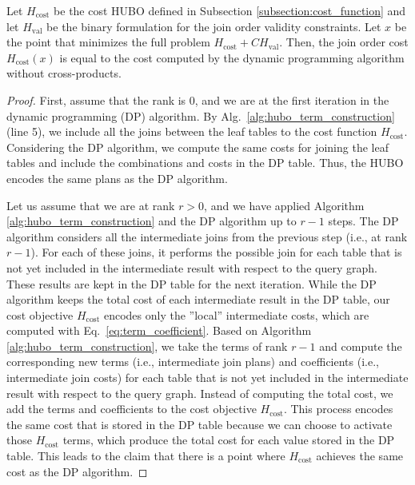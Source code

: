 \begin{theorem}\label{thm:dp_bound}
Let  $H_{\text{cost}}$ be the cost HUBO defined in Subsection \ref{subsection:cost_function} and let $H_{\text{val}}$ be the binary formulation for the join order validity constraints. Let $x$ be the point that minimizes the full problem $H_{\text{cost}} + CH_{\text{val}}$. Then, the join order cost $H_{\text{cost}}(x)$ is equal to the cost computed by the dynamic programming algorithm without cross-products.
\end{theorem}
\begin{proof}
First, assume that the rank is $0$, and we are at the first iteration in the dynamic programming (DP) algorithm. By Alg.~\ref{alg:hubo_term_construction} (line 5), we include all the joins between the leaf tables to the cost function $H_{\text{cost}}$. Considering the DP algorithm, we compute the same costs for joining the leaf tables and include the combinations and costs in the DP table. Thus, the HUBO encodes the same plans as the DP algorithm.

Let us assume that we are at rank $r > 0$, and we have applied Algorithm \ref{alg:hubo_term_construction} and the DP algorithm up to $r - 1$ steps. The DP algorithm considers all the intermediate joins from the previous step (i.e., at rank $r-1$). For each of these joins, it performs the possible join for each table that is not yet included in the intermediate result with respect to the query graph. These results are kept in the DP table for the next iteration. While the DP algorithm keeps the total cost of each intermediate result in the DP table, our cost objective $H_{\text{cost}}$ encodes only the ''local'' intermediate costs, which are computed with Eq.~\eqref{eq:term_coefficient}. Based on Algorithm \ref{alg:hubo_term_construction}, we take the terms of rank $r-1$ and compute the corresponding new terms (i.e., intermediate join plans) and coefficients (i.e., intermediate join costs) for each table that is not yet included in the intermediate result with respect to the query graph. Instead of computing the total cost, we add the terms and coefficients to the cost objective $H_{\text{cost}}$. This process encodes the same cost that is stored in the DP table because we can choose to activate those $H_{\text{cost}}$ terms, which produce the total cost for each value stored in the DP table. This leads to the claim that there is a point where $H_{\text{cost}}$ achieves the same cost as the DP algorithm.
\end{proof}

